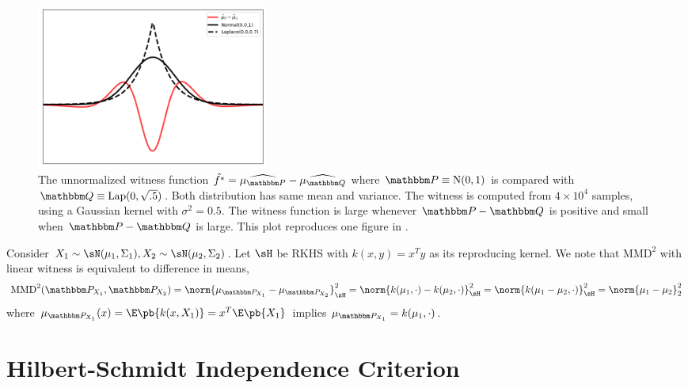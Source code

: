 \documentclass[11pt]{article}
\begin{document}
\begin{figure}[h!]
\begin{center} 
    \includegraphics[width=3in]{assets/mmd_gauss_laplace_witness} 
    \caption{The unnormalized witness function $\hat{f^*} = \widehat{\mu_{\bbP}} - \widehat{\mu_{\bbQ}}$ where $\bbP \equiv \text{N}(0,1)$ is compared with $\bbQ \equiv \text{Lap}(0,\sqrt{.5})$. Both distribution has same mean and variance. The witness is computed from $4\times 10^4$ samples, using a Gaussian kernel with $\sigma^2=0.5$. The witness function is large whenever $\bbP-\bbQ$ is positive and small when $\bbP-\bbQ$ is large. This plot reproduces one figure in \cite{grettonKernelTwoSampleTest2012}.}
    \label{fig:mmd_gauss_laplace_witness}
\end{center}
\end{figure}

    

\begin{example}
    Consider $X_1\sim \sN(\mu_1,\Sigma_1), X_2\sim \sN(\mu_2,\Sigma_2)$. Let $\sH$ be RKHS with $k(x,y)=x^Ty$ as its reproducing kernel. We note that $\text{MMD}^2$ with linear witness is equivalent to difference in means,
    \begin{align}
        \text{MMD}^2(\bbP_{X_1},\bbP_{X_2})
            = \norm{\mu_{\bbP_{X_1}} - \mu_{\bbP_{X_2}}}_{\sH}^2
            = \norm{ k(\mu_1, \cdot) - k(\mu_2,\cdot) }_{\sH}^2
            = \norm{ k(\mu_1-\mu_2,\cdot) }_{\sH}^2
            = \norm{\mu_1 - \mu_2}_2^2
    \end{align}
    where $\mu_{\bbP_{X_1}}(x) = \E\pb{ k(x, X_1) } = x^T\E\pb{X_1}$ implies $\mu_{\bbP_{X_1}} = k(\mu_1, \cdot)$.
\end{example}





\section{Hilbert-Schmidt Independence Criterion}
\end{document}
